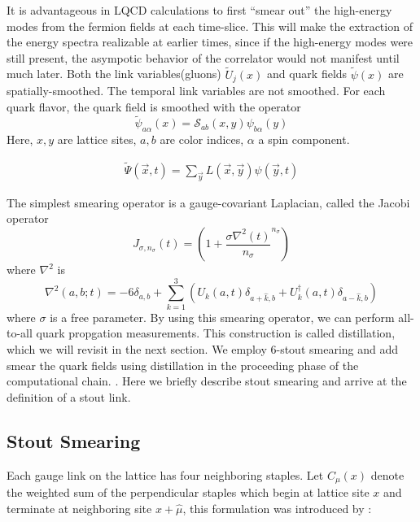 It is advantageous in LQCD calculations to first ``smear out'' the high-energy modes from the fermion fields at each time-slice. This will make the extraction of the energy spectra realizable at earlier times, since if the high-energy modes were still present, the asympotic behavior of the correlator would not manifest until much later. 
Both the link variables(gluons) $\tilde{U}_j(x)$ and quark fields $\tilde{\psi}(x)$ are spatially-smoothed. The temporal link variables are not smoothed. For each quark flavor, the quark field is smoothed with the operator
\begin{equation}
    \tilde{\psi}_{a\alpha}(x) = \mathcal{S}_{ab}(x,y) \psi_{b\alpha}(y)
\end{equation}
Here, $x,y$ are lattice sites, $a,b$ are color indices, $\alpha$ a spin component. 

\begin{align}
    \tilde{\Psi}(\vec{x},t) = \sum_{\vec{y}} L(\vec{x},\vec{y})\psi(\vec{y},t)
\end{align}

The simplest smearing operator is a gauge-covariant Laplacian, called the Jacobi operator \cite{peardon_novel_2009} 
\begin{equation}
    J_{\sigma,n_\sigma}(t) = \left(1 + \frac{\sigma\nabla^2(t)}{n_\sigma}^{n_\sigma}\right)
\end{equation} where $\nabla^2$ is \cite{10.5555/3029317}
\begin{equation}\label{eq:laplace}
    \nabla^2(a,b;t) =  -6\delta_{a,b} + \sum_{k=1}^{3} \left(U_k(a,t)\delta_{a+\hat{k},b} + U_k^{\dagger}(a,t)\delta_{a-\hat{k},b}\right)
\end{equation}
where $\sigma$ is a free parameter. 
By using this smearing operator, we can perform all-to-all quark propgation measurements. This construction is called distillation, which we will revisit in the next section.  
We employ 6-stout smearing \cite{stout} and add smear the quark fields using distillation in the proceeding phase of the computational chain. \cite{peardon_novel_2009}. Here we briefly describe stout smearing and arrive at the definition of a stout link. 

\subsection{Stout Smearing}
Each gauge link on the lattice has four neighboring staples. 
Let $C_\mu(x)$ denote the weighted sum of the perpendicular staples which
begin at lattice site $x$ and terminate at neighboring site 
$x\!+\!\hat{\mu}$, this formulation was introduced by \cite{stout}:

